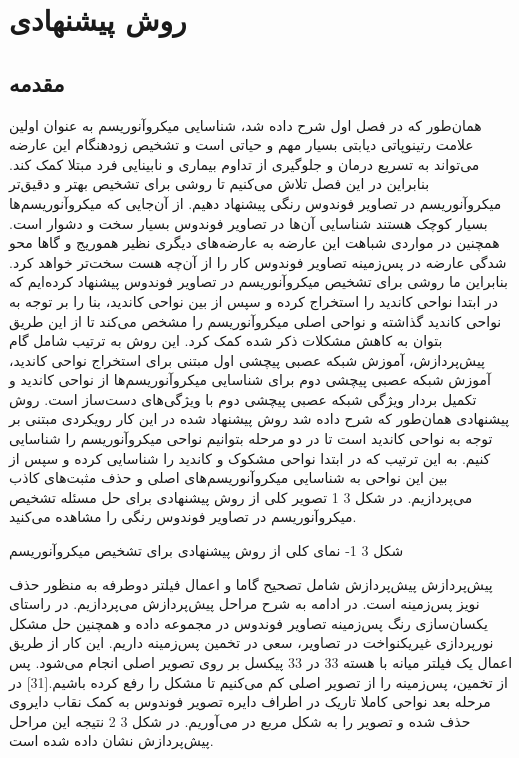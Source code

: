 \chapter{ روش پیشنهادی }
\section{مقدمه}\label{sec-model-motion}




همان‌طور که در فصل اول شرح داده شد، شناسایی میکروآنوریسم به عنوان اولین علامت رتینوپاتی دیابتی بسیار مهم و حیاتی است و تشخیص زودهنگام این عارضه می‌تواند به تسریع درمان و جلوگیری از تداوم بیماری و نابینایی فرد مبتلا کمک کند. بنابراین در این فصل تلاش می‌کنیم تا روشی برای تشخیص بهتر و دقیق‌تر میکروآنوریسم در تصاویر فوندوس رنگی پیشنهاد دهیم.
از آن‌جایی که میکروآنوریسم‌ها بسیار کوچک هستند شناسایی آن‌ها در تصاویر فوندوس بسیار سخت و دشوار است. همچنین در مواردی شباهت این عارضه به عارضه‌های دیگری نظیر هموریج و گاها محو شدگی عارضه در پس‌زمینه تصاویر فوندوس کار را از آن‌چه هست سخت‌تر خواهد کرد. بنابراین ما روشی برای تشخیص میکروآنوریسم در تصاویر فوندوس پیشنهاد کرده‌ایم که در ابتدا نواحی کاندید را استخراج کرده و سپس از بین نواحی کاندید، بنا را بر توجه به نواحی کاندید گذاشته و نواحی اصلی میکروآنوریسم را مشخص می‌کند تا از این طریق بتوان به کاهش مشکلات ذکر شده کمک کرد. این روش به ترتیب شامل گام پیش‌پردازش، آموزش شبکه عصبی پیچشی اول مبتنی برای استخراج نواحی کاندید، آموزش شبکه عصبی پیچشی دوم برای شناسایی میکروآنوریسم‌ها از نواحی کاندید و تکمیل بردار ویژگی شبکه عصبی پیچشی دوم با ویژگی‌های دست‌ساز است.
	روش پیشنهادی
همان‌طور که شرح داده شد روش پیشنهاد شده در این کار رویکردی مبتنی بر توجه به نواحی کاندید است تا در دو مرحله بتوانیم نواحی میکروآنوریسم را شناسایی کنیم. به این ترتیب که در ابتدا نواحی مشکوک و کاندید را شناسایی کرده و سپس از بین این نواحی به شناسایی میکروآنوریسم‌های اصلی و حذف مثبت‌های کاذب می‌پردازیم. در شکل ‏3 1 تصویر کلی از روش پیشنهادی برای حل مسئله تشخیص میکروآنوریسم در تصاویر فوندوس رنگی را مشاهده می‌کنید.

 
شکل ‏3 1- نمای کلی از روش پیشنهادی برای تشخیص میکروآنوریسم

پیش‌پردازش
پیش‌پردازش شامل تصحیح گاما و اعمال فیلتر دوطرفه به منظور حذف نویز پس‌زمینه است. در ادامه به شرح مراحل پیش‌پردازش می‌پردازیم.
در راستای یکسان‌سازی رنگ پس‌زمینه تصاویر فوندوس در مجموعه داده و همچنین حل مشکل نورپردازی غیریکنواخت در تصاویر، سعی در تخمین پس‌زمینه داریم. این کار از طریق اعمال یک فیلتر میانه با هسته 33 در 33 پیکسل بر روی تصویر اصلی انجام می‌شود. پس از تخمین، پس‌زمینه را از تصویر اصلی کم می‌کنیم تا مشکل را رفع کرده باشیم.[31]
در مرحله بعد نواحی کاملا تاریک در اطراف دایره تصویر فوندوس به کمک نقاب دایروی حذف شده و تصویر را به شکل مربع در می‌آوریم. در شکل ‏3 2 نتیجه این مراحل پیش‌پردازش نشان داده شده است.

